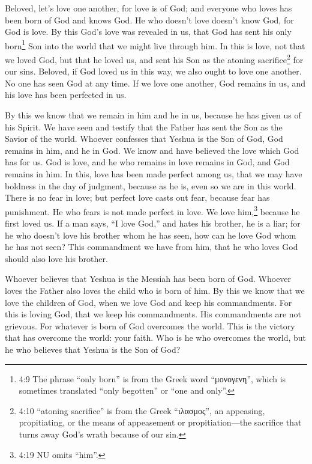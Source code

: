 \myverse{}Beloved, let’s love one another, for love is of God; and everyone who loves has been born of God and knows God. \myverse{}He who doesn’t love doesn’t know God, for God is love. \myverse{}By this God’s love was revealed in us, that God has sent his only born\footnote{ 4:9 The phrase “only born” is from the Greek word “μονογενη”, which is sometimes translated “only begotten” or “one and only”.} Son into the world that we might live through him. \myverse{}In this is love, not that we loved God, but that he loved us, and sent his Son as the atoning sacrifice\footnote{ 4:10 “atoning sacrifice” is from the Greek “ιλασμος”, an appeasing, propitiating, or the means of appeasement or propitiation—the sacrifice that turns away God’s wrath because of our sin.} for our sins. \myverse{}Beloved, if God loved us in this way, we also ought to love one another. \myverse{}No one has seen God at any time. If we love one another, God remains in us, and his love has been perfected in us.


\myverse{}By this we know that we remain in him and he in us, because he
has given us of his Spirit. \myverse{}We have seen and testify that the Father has sent the Son as the Savior of the world. \myverse{}Whoever confesses that Yeshua is the Son of God, God remains in him, and he in God. \myverse{}We know and have believed the love which God has for us. God is love, and he who remains in love remains in God, and God remains in him. \myverse{}In this, love has been made perfect among us, that we may have boldness in the day of judgment, because as he is, even so we are in this world. \myverse{}There is no fear in love; but perfect love casts out fear, because fear has punishment. He who fears is not made perfect in love. \myverse{}We love him,\footnote{ 4:19 NU omits “him”.} because he first loved us. \myverse{}If a man says, “I love God,” and hates his brother, he is a liar; for he who doesn’t love his brother whom he has seen, how can he love God whom he has not seen? \myverse{}This commandment we have from him, that he who loves God should also love his brother.


\mychapter{} \myverse*{}Whoever believes that Yeshua is the Messiah has been born of God. Whoever loves the Father also loves the child who is born of him. \myverse{}By this we know that we love the children of God, when we love God and keep his commandments. \myverse{}For this is loving God, that we keep his commandments. His commandments are not grievous. \myverse{}For whatever is born of God overcomes the world. This is the victory that has overcome the world: your faith. \myverse{}Who is he who overcomes the world, but he who believes that Yeshua is the Son of God?



